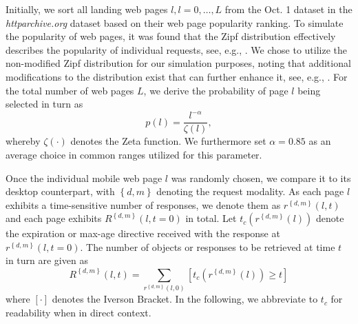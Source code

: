\documentclass[letterpaper,conference]{IEEEtran}
\begin{document}
Initially, we sort all landing web pages $l, l=0,\ldots,L$ from the Oct. 1 dataset in the \emph{httparchive.org} dataset based on their web page popularity ranking.
To simulate the popularity of web pages, it was found that the Zipf distribution effectively describes the popularity of individual requests, see, e.g., \cite{}. 
We chose to utilize the non-modified Zipf distribution for our simulation purposes, noting that additional modifications to the distribution exist that can further enhance it, see, e.g., \cite{KrTeSh06}.
For the total number of web pages $L$, we derive the probability of page $l$ being selected in turn as
\begin{equation}
p(l)=\frac{l^{-\alpha}}{\zeta(l)},
\end{equation}
whereby $\zeta(\cdot)$ denotes the Zeta function. 
We furthermore set $\alpha=0.85$ as an average choice in common ranges utilized for this parameter.


Once the individual mobile web page $l$ was randomly chosen, we compare it to its desktop counterpart, with $\left\{ d,m \right\}$ denoting the request modality.
As each page $l$ exhibits a time-sensitive number of responses, we denote them as $r^{\left\{ d,m \right\}}(l,t)$ and each page exhibits $R^{\left\{ d,m \right\}}(l,t=0)$ in total.
Let $t_c(r^{\left\{ d,m \right\}}(l))$ denote the expiration or max-age directive received with the response at $r^{\left\{ d,m \right\}}(l,t=0)$.
The number of objects or responses to be retrieved at time $t$ in turn are given as 
\begin{equation}
R^{\left\{ d,m \right\}}(l,t) = \sum_{r^{\left\{ d,m \right\}}(l,0)} \left[ t_c(r^{\left\{ d,m \right\}}(l)) \ge t \right]
\end{equation}
where $\left[ \cdot \right] $ denotes the Iverson Bracket.
In the following, we abbreviate to $t_c$ for readability when in direct context.
\end{document}
